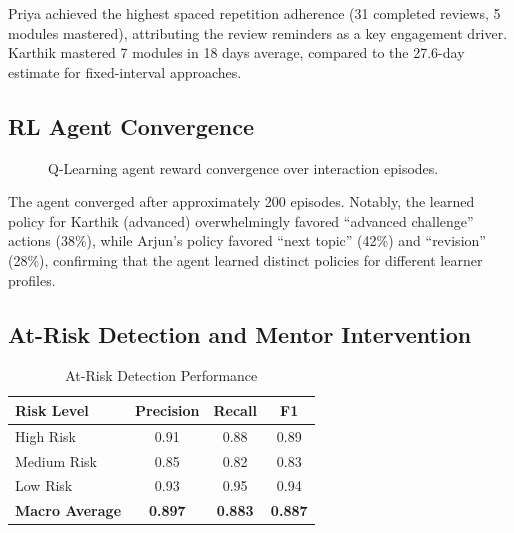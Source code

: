 \documentclass[conference]{IEEEtran}
\begin{document}
Priya achieved the highest spaced repetition adherence (31 completed reviews, 5 modules mastered), attributing the review reminders as a key engagement driver. Karthik mastered 7 modules in 18 days average, compared to the 27.6-day estimate for fixed-interval approaches.

\subsection{RL Agent Convergence}

\begin{figure}[htbp]
\centerline{}
\caption{Q-Learning agent reward convergence over interaction episodes.}
\label{fig:rl_convergence}
\end{figure}

The agent converged after approximately 200 episodes. Notably, the learned policy for Karthik (advanced) overwhelmingly favored ``advanced challenge'' actions (38\%), while Arjun's policy favored ``next topic'' (42\%) and ``revision'' (28\%), confirming that the agent learned distinct policies for different learner profiles.

\subsection{At-Risk Detection and Mentor Intervention}

\begin{table}[htbp]
\caption{At-Risk Detection Performance}
\label{tab:risk_detection}
\centering
\begin{tabular}{lccc}
\toprule
\textbf{Risk Level} & \textbf{Precision} & \textbf{Recall} & \textbf{F1} \\
\midrule
High Risk & 0.91 & 0.88 & 0.89 \\
Medium Risk & 0.85 & 0.82 & 0.83 \\
Low Risk & 0.93 & 0.95 & 0.94 \\
\midrule
\textbf{Macro Average} & \textbf{0.897} & \textbf{0.883} & \textbf{0.887} \\
\bottomrule
\end{tabular}
\end{table}
\end{document}
